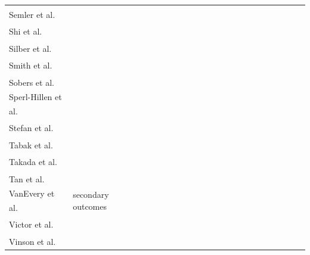 \documentclass[11pt]{article}
\begin{document}
\begin{landscape}
\begin{longtable}{L{1.5cm} L{1.1cm} C{0.6cm} C{0.6cm} L{1.2cm} C{0.6cm} C{0.6cm} C{0.6cm} C{0.6cm} L{0.9cm} L{1cm} L{1cm} C{0.6cm} C{0.6cm} L{1.1cm} L{1.2cm} L{1.2cm} C{0.6cm} L{1.2cm} L{1.2cm} L{1.2cm} C{0.6cm}}
Semler et al.\textsuperscript{\cite{semlerOxygenSaturationTargetsCritically2022}} & & & & & & & & & & & & & & & & & & & & & \\

Shi et al.\textsuperscript{\cite{shiSolvingInsomniaElectronically2019}} & & & & & & & & & & & & & & & & & & & & & \\

Silber et al.\textsuperscript{\cite{silberPatientSafetyOutcomes2019}} & & & & & & & & & & & & & & & & & & & & & \\

Smith et al.\textsuperscript{\cite{smithCommunityInterventionReduce2025}} & & & & & & & & & & & & & & & & & & & & & \\

Sobers et al.\textsuperscript{\cite{sobersAssessingEffectivenessImplementation2021}} & & & & & & & & & & & & & & & & & & & & & \\

Sperl-Hillen et al.\textsuperscript{\cite{sperl-hillenProtocolPatientRandomized2024}} & & & & & & & & & & & & & & & & & & & & & \\

Stefan et al.\textsuperscript{\cite{stefanUpdateStudyProtocol2021}} & & & & & & & & & & & & & & & & & & & & & \\

Tabak et al.\textsuperscript{\cite{tabakDisseminatingImplementingLifestylebased2019}} & & & & & & & & & & & & & & & & & & & & & \\

Takada et al.\textsuperscript{\cite{takadaProtocolType32025}} & & & & & & & & & & & & & & & & & & & & & \\

Tan et al.\textsuperscript{\cite{tanTELEhealthSharedDecisionmaking2024}} & & & & & & & & & & & & & & & & & & & & & \\

VanEvery et al.\textsuperscript{\cite{vaneveryImpactAvocadoIntake2023}} & secondary outcomes & & & & & & & & & & & & & & & & & & & & \\

Victor et al.\textsuperscript{\cite{victorClusterRandomizedTrialBloodPressure2018}} & & & & & & & & & & & & & & & & & & & & & \\

Vinson et al.\textsuperscript{\cite{vinsonDecisionSupportIntervention2024}} & & & & & & & & & & & & & & & & & & & & & \\


\end{longtable}
\end{landscape}
\end{document}
